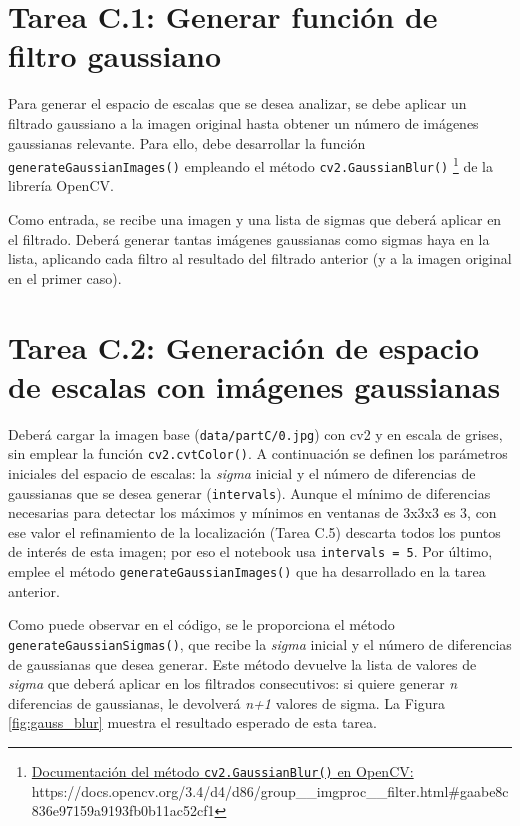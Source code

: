 \section*{Tarea C.1: Generar función de filtro gaussiano}
{}

Para generar el espacio de escalas que se desea analizar, se debe aplicar un filtrado gaussiano a la imagen original hasta obtener un número de imágenes gaussianas relevante. Para ello, debe desarrollar la función \texttt{generateGaussianImages()} empleando el método \texttt{cv2.GaussianBlur()} \footnote{ \href{https://docs.opencv.org/3.4/d4/d86/group\_\_imgproc\_\_filter.html\#gaabe8c836e97159a9193fb0b11ac52cf1}{Documentación del método \texttt{cv2.GaussianBlur()} en OpenCV:} \\{https://docs.opencv.org/3.4/d4/d86/group\_\_imgproc\_\_filter.html\#gaabe8c836e97159a9193fb0b11ac52cf1}} de la librería OpenCV.

Como entrada, se recibe una imagen y una lista de sigmas que deberá aplicar en el filtrado. Deberá generar tantas imágenes gaussianas como sigmas haya en la lista, aplicando cada filtro al resultado del filtrado anterior (y a la imagen original en el primer caso).

\section*{Tarea C.2: Generación de espacio de escalas con imágenes gaussianas}
{}

Deberá cargar la imagen base (\texttt{data/partC/0.jpg}) con cv2 y en escala de grises, sin emplear la función \texttt{cv2.cvtColor()}. A continuación se definen los parámetros iniciales del espacio de escalas: la \textit{sigma} inicial y el número de diferencias de gaussianas que se desea generar (\texttt{intervals}). Aunque el mínimo de diferencias necesarias para detectar los máximos y mínimos en ventanas de 3x3x3 es 3, con ese valor el refinamiento de la localización (Tarea C.5) descarta todos los puntos de interés de esta imagen; por eso el notebook usa \texttt{intervals = 5}. Por último, emplee el método \texttt{generateGaussianImages()} que ha desarrollado en la tarea anterior.

Como puede observar en el código, se le proporciona el método \texttt{generateGaussianSigmas()}, que recibe la \textit{sigma} inicial y el número de diferencias de gaussianas que desea generar. Este método devuelve la lista de valores de \textit{sigma} que deberá aplicar en los filtrados consecutivos: si quiere generar \textit{n} diferencias de gaussianas, le devolverá \textit{n+1} valores de sigma. La Figura \ref{fig:gauss_blur} muestra el resultado esperado de esta tarea.

